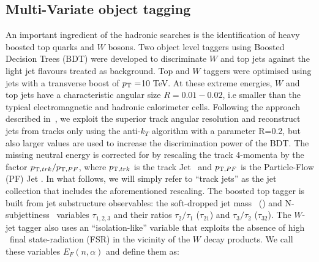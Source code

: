 \documentclass[a4paper,11pt]{article}
\begin{document}
\subsection{Multi-Variate object tagging}
\label{subsec:mvatagger}

An important ingredient of the hadronic searches is the identification of heavy boosted top quarks and $W$ bosons. Two object level taggers using Boosted Decision Trees (BDT) were developed to discriminate $W$ and top jets against the light jet flavours treated as background.
Top and $W$ taggers were optimised using jets with a transverse boost of $p_{\text{T}}=$10 TeV. At these extreme energies, $W$ and top jets have a characteristic angular size $R=0.01-0.02$, i.e smaller than the typical electromagnetic and hadronic calorimeter cells. Following the approach described in~\cite{Larkoski:2015yqa}, we exploit the superior track angular resolution and reconstruct jets from tracks only using the anti-$k_T$ algorithm with a parameter R=0.2, but also larger values are used to increase the discrimination power of the BDT. The missing neutral energy is corrected for by rescaling the track 4-momenta by the factor $p_{\text{T} ,trk}/p_{\text{T} ,PF}$, where $p_{\text{T} ,trk}$ is the track Jet \pt\ and $p_{\text{T} ,PF}$ is the Particle-Flow (PF) Jet \pt. In what follows, we will simply refer to ``track jets'' as the jet collection that includes the aforementioned rescaling. The boosted top tagger is built from jet substructure observables: the soft-dropped jet mass~\cite{Larkoski:2014wba} (\mSD) and N-subjettiness~\cite{Thaler:2010tr} variables $\tau_{1,2,3}$ and their ratios $\tau_{2}/\tau_{1}$ ($\tau_{21}$) and $\tau_{3}/\tau_{2}$ ($\tau_{32}$). The $W$-jet tagger also uses an ``isolation-like'' variable that exploits the absence of high \pt\ final state-radiation (FSR) in the vicinity of the $W$ decay products. We call these variables $E_{F}(n,\alpha)$ and define them as:

\end{document}
